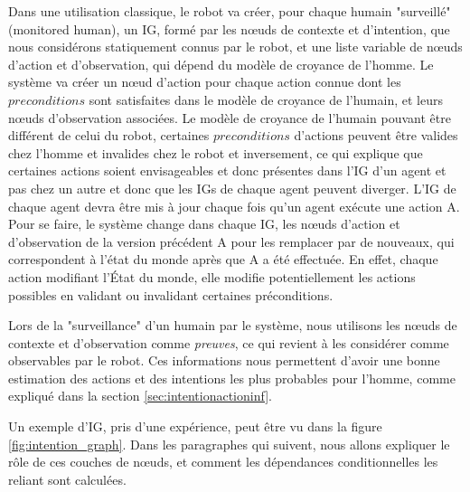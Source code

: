 \documentclass[a4paper,11pt,twoside]{StyleThese}
\begin{document}
Dans une utilisation classique, le robot va créer, pour chaque humain "surveillé" (monitored human), un IG, formé par les nœuds de contexte et d'intention, que nous considérons statiquement connus par le robot, et une liste variable de nœuds d'action et d'observation, qui dépend du modèle de croyance de l'homme. Le système va créer un nœud d'action pour chaque action connue dont les  $preconditions$ sont satisfaites dans le modèle de croyance de l'humain, et leurs nœuds d'observation associées. Le modèle de croyance de l'humain pouvant être différent de celui du robot, certaines $preconditions$ d'actions peuvent être valides chez l'homme et invalides chez le robot et inversement, ce qui explique que certaines actions soient envisageables et donc présentes dans l'IG d'un agent et pas chez un autre et donc que les IGs de chaque agent peuvent diverger. L'IG de chaque agent devra être mis à jour chaque fois qu'un agent exécute une action A. Pour se faire, le système change dans chaque IG, les nœuds d'action et d'observation de la version précédent A pour les remplacer par de nouveaux, qui correspondent à l'état du monde après que A a été effectuée. En effet, chaque action modifiant l'État du monde, elle modifie potentiellement les actions possibles en validant ou invalidant certaines préconditions.


Lors de la "surveillance" d'un humain par le système, nous utilisons les nœuds de contexte et d'observation comme \textit{preuves}, ce qui revient à les considérer comme observables par le robot. Ces informations nous permettent d'avoir une bonne estimation des actions et des intentions les plus probables pour l'homme, comme expliqué dans la section \ref{sec:intentionactioninf}.

Un exemple d'IG, pris d'une expérience, peut être vu dans la figure \ref{fig:intention_graph}. Dans les paragraphes qui suivent, nous allons expliquer le rôle de ces couches de nœuds, et comment les dépendances conditionnelles les reliant sont calculées.
\end{document}
